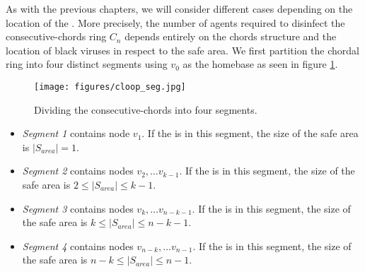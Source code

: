 %

\noindent As with the previous chapters, we will consider different cases depending on the location of the \bv.
More precisely, the number of agents required to disinfect the consecutive-chords ring $C_n$ depends entirely on the chords structure and the location of black viruses in respect to the safe area. We first  partition the chordal ring into four distinct segments using $v_0$ as the homebase as seen in figure \ref{fig:cloop-seg}.
\begin{figure}[H]
  \centering  
  \texttt{[image: figures/cloop\_seg.jpg]}
  \caption{Dividing the consecutive-chords into four segments.}\label{fig:cloop-seg}
\end{figure}
\begin{itemize}
\item {\em Segment 1} contains node $v_1$.  
If the \bv is in this segment, the size of the safe area is $|S_{area}| =1$.
\item {\em  Segment 2} contains nodes $v_2, \ldots v_{k-1}$.   If the \bv is in this segment, the size of the safe area is $2\leq |S_{area}| \leq k-1$.
\item {\em   Segment 3} contains nodes $v_k, \ldots v_{n-k-1}$.   If the \bv is in this segment, the size of the safe area is $k\leq |S_{area}| \leq n-k-1$.
\item {\em Segment 4}  contains nodes $v_{n-k}, \ldots v_{n-1}$.   If the \bv is in this segment, the size of the safe area is $n-k\leq |S_{area}| \leq n-1$.
\end{itemize}

 


